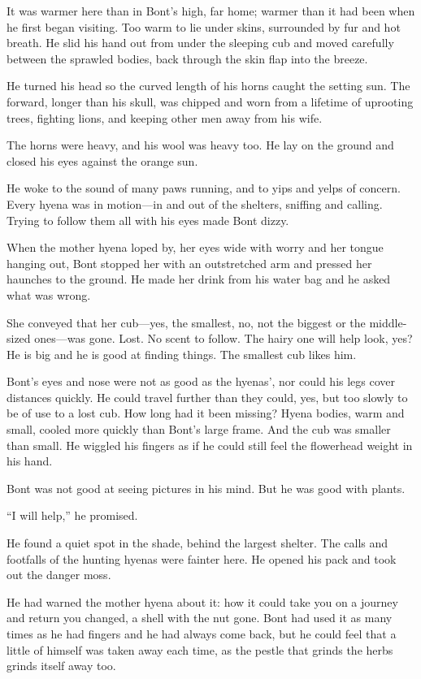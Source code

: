 It was warmer here than in Bont's high, far home; warmer than it had been when he first began visiting. Too warm to lie under skins, surrounded by fur and hot breath. He slid his hand out from under the sleeping cub and moved carefully between the sprawled bodies, back through the skin flap into the breeze.

He turned his head so the curved length of his horns caught the setting sun. The forward, longer than his skull, was chipped and worn from a lifetime of uprooting trees, fighting lions, and keeping other men away from his wife.

The horns were heavy, and his wool was heavy too. He lay on the ground and closed his eyes against the orange sun.

\secdiv

\noindent He woke to the sound of many paws running, and to yips and yelps of concern. Every hyena was in motion---in and out of the shelters, sniffing and calling. Trying to follow them all with his eyes made Bont dizzy.

When the mother hyena loped by, her eyes wide with worry and her tongue hanging out, Bont stopped her with an outstretched arm and pressed her haunches to the ground. He made her drink from his water bag and he asked what was wrong.

She conveyed that her cub---yes, the smallest, no, not the biggest or the middle-sized ones---was gone. Lost. No scent to follow. The hairy one will help look, yes? He is big and he is good at finding things. The smallest cub likes him.

Bont's eyes and nose were not as good as the hyenas', nor could his legs cover distances quickly. He could travel further than they could, yes, but too slowly to be of use to a lost cub. How long had it been missing? Hyena bodies, warm and small, cooled more quickly than Bont's large frame. And the cub was smaller than small. He wiggled his fingers as if he could still feel the flowerhead weight in his hand.

Bont was not good at seeing pictures in his mind. But he was good with plants.

``I will help,'' he promised.

He found a quiet spot in the shade, behind the largest shelter. The calls and footfalls of the hunting hyenas were fainter here. He opened his pack and took out the danger moss.

He had warned the mother hyena about it: how it could take you on a journey and return you changed, a shell with the nut gone. Bont had used it as many times as he had fingers and he had always come back, but he could feel that a little of himself was taken away each time, as the pestle that grinds the herbs grinds itself away too.

